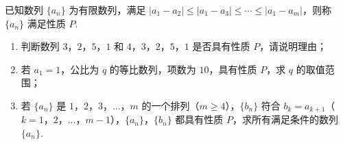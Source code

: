 \begin{problem}
已知数列 \(\{a_n\}\) 为有限数列，满足 \(|a_1-a_2|\le|a_1-a_3|\le\cdots\le|a_1-a_m|\)，则称 \(\{a_n\}\) 满足性质 \(P\).

\begin{enumerate}
\item 判断数列 \(3\)，\(2\)，\(5\)，\(1\) 和 \(4\)，\(3\)，\(2\)，\(5\)，\(1\) 是否具有性质 \(P\)，请说明理由；
\item 若 \(a_1=1\)，公比为 \(q\) 的等比数列，项数为 \(10\)，具有性质 \(P\)，求 \(q\) 的取值范围；
\item 若 \(\{a_n\}\) 是 \(1\)，\(2\)，\(3\)，\(\ldots\)，\(m\) 的一个排列（\(m\ge4\)），\(\{b_n\}\) 符合 \(b_k=a_{k+1}\)（\(k=1\)，\(2\)，\(\ldots\)，\(m-1\)），\(\{a_n\}\)，\(\{b_n\}\) 都具有性质 \(P\)，求所有满足条件的数列 \(\{a_n\}\).
\end{enumerate}
\end{problem}

